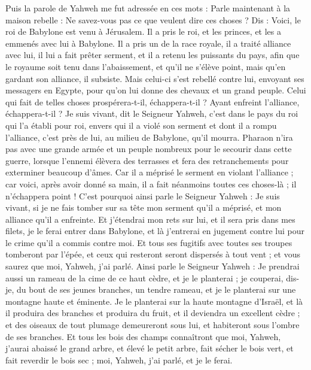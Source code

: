 \begin{multicols}{2}
Puis la parole de Yahweh me fut adressée en ces mots :
Parle maintenant à la maison rebelle : Ne savez-vous pas ce que veulent dire ces choses ? Dis : Voici, le roi de Babylone est venu à Jérusalem. Il a pris le roi, et les princes, et les a emmenés avec lui à Babylone.
Il a pris un de la race royale, il a traité alliance avec lui, il lui a fait prêter serment, et il a retenu les puissants du pays,
afin que le royaume soit tenu dans l'abaissement, et qu'il ne s'élève point, mais qu'en gardant son alliance, il subsiste.
Mais celui-ci s'est rebellé contre lui, envoyant ses messagers en Egypte, pour qu'on lui donne des chevaux et un grand peuple. Celui qui fait de telles choses prospérera-t-il, échappera-t-il ? Ayant enfreint l'alliance, échappera-t-il ?
Je suis vivant, dit le Seigneur Yahweh, c'est dans le pays du roi qui l'a établi pour roi, envers qui il a violé son serment et dont il a rompu l'alliance, c'est près de lui, au milieu de Babylone, qu'il mourra.
Pharaon n'ira pas avec une grande armée et un peuple nombreux pour le secourir dans cette guerre, lorsque l'ennemi élèvera des terrasses et fera des retranchements pour exterminer beaucoup d'âmes.
Car il a méprisé le serment en violant l'alliance ; car voici, après avoir donné sa main, il a fait néanmoins toutes ces choses-là ; il n'échappera point !
C'est pourquoi ainsi parle le Seigneur Yahweh : Je suis vivant, si je ne fais tomber sur sa tête mon serment qu'il a méprisé, et mon alliance qu'il a enfreinte.
Et j'étendrai mon rets sur lui, et il sera pris dans mes filets, je le ferai entrer dans Babylone, et là j'entrerai en jugement contre lui pour le crime qu'il a commis contre moi.
Et tous ses fugitifs avec toutes ses troupes tomberont par l'épée, et ceux qui resteront seront dispersés à tout vent ; et vous saurez que moi, Yahweh, j'ai parlé.
Ainsi parle le Seigneur Yahweh : Je prendrai aussi un rameau de la cime de ce haut cèdre, et je le planterai ; je couperai, dis-je, du bout de ses jeunes branches, un tendre rameau, et je le planterai sur une montagne haute et éminente.
Je le planterai sur la haute montagne d'Israël, et là il produira des branches et produira du fruit, et il deviendra un excellent cèdre ; et des oiseaux de tout plumage demeureront sous lui, et habiteront sous l'ombre de ses branches.
Et tous les bois des champs connaîtront que moi, Yahweh, j'aurai abaissé le grand arbre, et élevé le petit arbre, fait sécher le bois vert, et fait reverdir le bois sec ; moi, Yahweh, j'ai parlé, et je le ferai.

\end{multicols}
